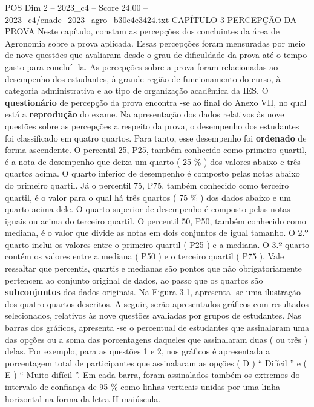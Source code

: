 \begin{textsample}{POS Dim 2 – 2023\_c4 – Score 24.00 – 2023\_c4/enade\_2023\_agro\_b30e4e3424.txt}  \label{ex:f2_pos_010}
CAPÍTULO 3 PERCEPÇÃO DA PROVA Neste capítulo, constam as percepções dos concluintes da área de Agronomia sobre a prova aplicada.
Essas percepções foram mensuradas por meio de nove questões que avaliaram desde o grau de dificuldade da prova até o tempo gasto para concluí -la.
As percepções sobre a prova foram relacionadas ao desempenho dos estudantes, à grande região de funcionamento do curso, à categoria administrativa e ao tipo de organização acadêmica da IES.
O \textbf{questionário} de percepção da prova encontra -se ao final do Anexo VII, no qual está a \textbf{reprodução} do exame.
Na apresentação dos dados relativos às nove questões sobre as percepções a respeito da prova, o desempenho dos estudantes foi classificado em quatro quartos.
Para tanto, esse desempenho foi \textbf{ordenado} de forma ascendente.
O percentil 25, P25, também conhecido como primeiro quartil, é a nota de desempenho que deixa um quarto ( 25 \% ) dos valores abaixo e três quartos acima.
O quarto inferior de desempenho é composto pelas notas abaixo do primeiro quartil.
Já o percentil 75, P75, também conhecido como terceiro quartil, é o valor para o qual há três quartos ( 75 \% ) dos dados abaixo e um quarto acima dele.
O quarto superior de desempenho é composto pelas notas iguais ou acima do terceiro quartil.
O percentil 50, P50, também conhecido como mediana, é o valor que divide as notas em dois conjuntos de igual tamanho.
O 2.º quarto inclui os valores entre o primeiro quartil ( P25 ) e a mediana.
O 3.º quarto contém os valores entre a mediana ( P50 ) e o terceiro quartil ( P75 ).
Vale ressaltar que percentis, quartis e medianas são pontos que não obrigatoriamente pertencem ao conjunto original de dados, ao passo que os quartos são \textbf{subconjuntos} dos dados originais.
Na Figura 3.1, apresenta -se uma ilustração dos quatro quartos descritos.
A seguir, serão apresentados gráficos com resultados selecionados, relativos às nove questões avaliadas por grupos de estudantes.
Nas barras dos gráficos, apresenta -se o percentual de estudantes que assinalaram uma das opções ou a soma das porcentagens daqueles que assinalaram duas ( ou três ) delas.
Por exemplo, para as questões 1 e 2, nos gráficos é apresentada a porcentagem total de participantes que assinalaram as opções ( D ) “ Difícil ” e ( E ) “ Muito difícil ”.
Em cada barra, foram assinalados também os extremos do intervalo de confiança de 95 \% como linhas verticais unidas por uma linha horizontal na forma da letra H maiúscula.

\end{textsample}
